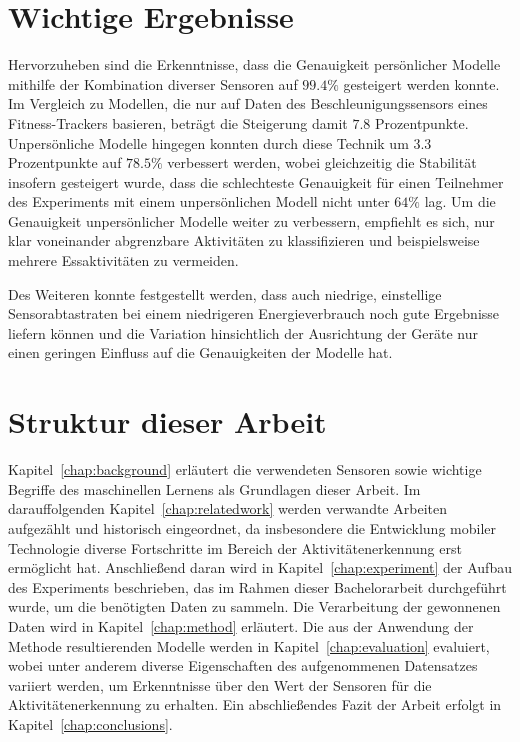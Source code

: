 \section{Wichtige Ergebnisse}
Hervorzuheben sind die Erkenntnisse, dass die Genauigkeit persönlicher Modelle mithilfe der Kombination diverser Sensoren auf $99.4 \%$ gesteigert werden konnte. Im Vergleich zu Modellen, die nur auf Daten des Beschleunigungssensors eines Fitness-Trackers basieren, beträgt die Steigerung damit $7.8$ Prozentpunkte. Unpersönliche Modelle hingegen konnten durch diese Technik um $3.3$ Prozentpunkte auf $78.5 \%$ verbessert werden, wobei gleichzeitig die Stabilität insofern gesteigert wurde, dass die schlechteste Genauigkeit für einen Teilnehmer des Experiments mit einem unpersönlichen Modell nicht unter $64 \%$ lag. Um die Genauigkeit unpersönlicher Modelle weiter zu verbessern, empfiehlt es sich, nur klar voneinander abgrenzbare Aktivitäten zu klassifizieren und beispielsweise mehrere Essaktivitäten zu vermeiden.

Des Weiteren konnte festgestellt werden, dass auch niedrige, einstellige Sensorabtastraten bei einem niedrigeren Energieverbrauch noch gute Ergebnisse liefern können und die Variation hinsichtlich der Ausrichtung der Geräte nur einen geringen Einfluss auf die Genauigkeiten der Modelle hat.

\section{Struktur dieser Arbeit}
Kapitel~\ref{chap:background} erläutert die verwendeten Sensoren sowie wichtige Begriffe des maschinellen Lernens als Grundlagen dieser Arbeit. Im darauffolgenden Kapitel~\ref{chap:relatedwork} werden verwandte Arbeiten aufgezählt und historisch eingeordnet, da insbesondere die Entwicklung mobiler Technologie diverse Fortschritte im Bereich der Aktivitätenerkennung erst ermöglicht hat. Anschließend daran wird in Kapitel~\ref{chap:experiment} der Aufbau des Experiments beschrieben, das im Rahmen dieser Bachelorarbeit durchgeführt wurde, um die benötigten Daten zu sammeln. Die Verarbeitung der gewonnenen Daten wird in Kapitel~\ref{chap:method} erläutert. Die aus der Anwendung der Methode resultierenden Modelle werden in Kapitel~\ref{chap:evaluation} evaluiert, wobei unter anderem diverse Eigenschaften des aufgenommenen Datensatzes variiert werden, um Erkenntnisse über den Wert der Sensoren für die Aktivitätenerkennung zu erhalten. Ein abschließendes Fazit der Arbeit erfolgt in Kapitel~\ref{chap:conclusions}.


